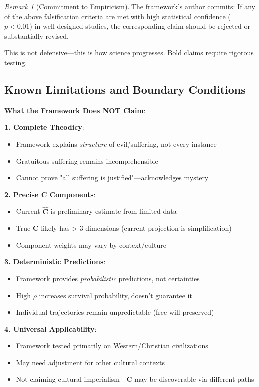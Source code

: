 \documentclass[11pt,a4paper]{article}
\theoremstyle{definition}
\theoremstyle{remark}
\newtheorem{remark}{Remark}[section]
\begin{document}
\begin{small}
\begin{enumerate}
\begin{remark}[Commitment to Empiricism]
The framework's author commits: If any of the above falsification criteria are met with high statistical confidence (\(p < 0.01\)) in well-designed studies, the corresponding claim should be rejected or substantially revised.

This is not defensive—this is how science progresses. Bold claims require rigorous testing.
\end{remark}

\subsection{Known Limitations and Boundary Conditions}

\begin{mdframed}[backgroundcolor=yellow!10,linewidth=2pt]
\textbf{What the Framework Does NOT Claim}:

\textbf{1. Complete Theodicy}:
\begin{itemize}
    \item Framework explains \textit{structure} of evil/suffering, not every instance
    \item Gratuitous suffering remains incomprehensible
    \item Cannot prove "all suffering is justified"—acknowledges mystery
\end{itemize}

\textbf{2. Precise \(\mathbf{C}\) Components}:
\begin{itemize}
    \item Current \(\hat{\mathbf{C}}\) is preliminary estimate from limited data
    \item True \(\mathbf{C}\) likely has > 3 dimensions (current projection is simplification)
    \item Component weights may vary by context/culture
\end{itemize}

\textbf{3. Deterministic Predictions}:
\begin{itemize}
    \item Framework provides \textit{probabilistic} predictions, not certainties
    \item High \(\rho\) increases survival probability, doesn't guarantee it
    \item Individual trajectories remain unpredictable (free will preserved)
\end{itemize}

\textbf{4. Universal Applicability}:
\begin{itemize}
    \item Framework tested primarily on Western/Christian civilizations
    \item May need adjustment for other cultural contexts
    \item Not claiming cultural imperialism—\(\mathbf{C}\) may be discoverable via different paths
\end{itemize}


\end{mdframed}
\end{enumerate}
\end{small}
\end{document}
